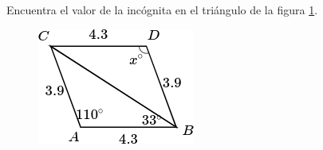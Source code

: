 Encuentra el valor de la incógnita en el triángulo de la figura \ref{fig:angle_triangle_08}.

\begin{minipage}[t][5cm][b]{0.3\textwidth}
    \begin{figure}[H]
        \centering
        \includegraphics[width=0.9\linewidth]{../images/angle_triangle_08.png}

        \caption{}
        \label{fig:angle_triangle_08}
    \end{figure}
\end{minipage}\hfill
\begin{minipage}[t]{0.65\textwidth}
    \begin{solutionbox}{5cm}

    \end{solutionbox}
\end{minipage}
